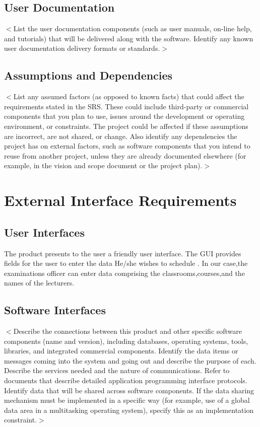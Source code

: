 \documentclass{scrreprt}
\begin{document}
\section{User Documentation}
$<$List the user documentation components (such as user manuals, on-line help, 
and tutorials) that will be delivered along with the software. Identify any 
known user documentation delivery formats or standards.$>$
\section{Assumptions and Dependencies}

$<$List any assumed factors (as opposed to known facts) that could affect the 
requirements stated in the SRS. These could include third-party or commercial 
components that you plan to use, issues around the development or operating 
environment, or constraints. The project could be affected if these assumptions 
are incorrect, are not shared, or change. Also identify any dependencies the 
project has on external factors, such as software components that you intend to 
reuse from another project, unless they are already documented elsewhere (for 
example, in the vision and scope document or the project plan).$>$


\chapter{External Interface Requirements}

\section{User Interfaces}
The product presents to the user a friendly user interface. The GUI provides fields for the user to enter the data He/she wishes to schedule . In our case,the examinations officer can enter data comprising the classrooms,courses,and the names of the lecturers.

 

\section{Software Interfaces}
$<$Describe the connections between this product and other specific software 
components (name and version), including databases, operating systems, tools, 
libraries, and integrated commercial components. Identify the data items or 
messages coming into the system and going out and describe the purpose of each.  
Describe the services needed and the nature of communications. Refer to 
documents that describe detailed application programming interface protocols.  
Identify data that will be shared across software components. If the data 
sharing mechanism must be implemented in a specific way (for example, use of a 
global data area in a multitasking operating system), specify this as an 
implementation constraint.$>$
\end{document}
